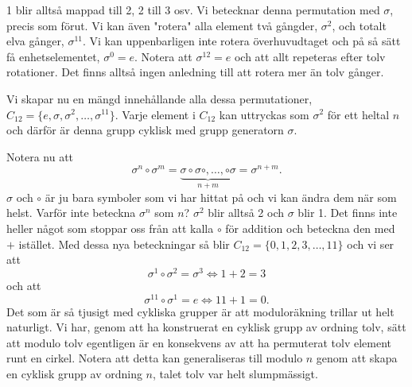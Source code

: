 \documentclass{article}
\theoremstyle{definition}
\begin{document}
\begin{center}
\end{center}
1 blir alltså mappad till 2, 2 till 3 osv. Vi betecknar denna permutation med $\sigma$,
precis som förut. Vi kan även "rotera" alla element två gångder, $\sigma^2$,
och totalt elva gånger, $\sigma^{11}$. Vi kan uppenbarligen inte rotera överhuvudtaget 
och på så sätt få enhetselementet, $\sigma^0 = e.$
Notera att $\sigma^{12} = e$ och att allt repeteras efter tolv rotationer. 
Det finns alltså ingen anledning till att rotera mer än tolv gånger.

Vi skapar nu en mängd innehållande alla dessa permutationer, 
\linebreak
$C_{12} = \{e, \sigma, \sigma^2, \ldots, \sigma^{11}\}$. Varje element i $C_{12}$ kan
uttryckas som $\sigma^2$ för ett heltal $n$ och därför är denna grupp cyklisk med grupp generatorn $\sigma$.

Notera nu att 
\[\sigma^n \circ \sigma^m = 
\underbrace{\sigma \circ \sigma \circ, \ldots, \circ \sigma}_{\text{$n + m$}} = \sigma^{n+m}.\]
$\sigma$ och $\circ$ är ju bara symboler som vi har hittat på och vi kan ändra dem när som helst. 
Varför inte beteckna $\sigma^n$ som $n$? $\sigma^2$ blir alltså 2 och $\sigma$ blir 1. 
Det finns inte heller något som stoppar oss från att kalla $\circ$ för addition och beteckna den 
med $+$ istället. Med dessa nya beteckningar så blir
$C_{12} = \{0, 1, 2, 3, \ldots, 11\}$ 
och vi ser att
\[\sigma^1 \circ \sigma^2 = \sigma^3 \iff 1 + 2 = 3\]
och att 
\[\sigma^{11} \circ \sigma^1 = e \iff 11 + 1 = 0.\]
Det som är så tjusigt med cykliska grupper är att moduloräkning trillar ut helt naturligt. 
Vi har, genom att ha konstruerat en cyklisk grupp av ordning tolv, 
sätt att modulo tolv egentligen är en konsekvens av 
att ha permuterat tolv element runt en cirkel. Notera att detta kan generaliseras till 
modulo $n$ genom att skapa en cyklisk grupp av ordning $n$, talet tolv var helt slumpmässigt.
\end{document}
